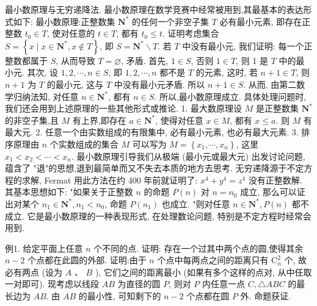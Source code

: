 
最小数原理与无穷递降法.
最小数原理在数学竞赛中经常被用到,其最基本的表达形式如下:
最小数原理:正整数集 $\mathbf{N}^*$ 的任何一个非空子集 $T$ 必有最小元素, 即存在正整数 $t_0 \in T$, 使对任意的 $t \in T$, 都有 $t_0 \leqslant t$.
证明考虑集合 $S=\left\{x \mid x \in \mathbf{N}^*, x \notin T\right\}$, 即 $S=\mathbf{N}^* \backslash T$.
若 $T$ 中没有最小元, 我们证明: 每一个正整数都属于 $S$, 从而导致 $T=\varnothing$, 矛盾.
首先, $1 \in S$, 否则 $1 \in T$, 则 1 是 $T$ 中的最小元.
其次, 设 $1,2, \cdots, n \in S$, 即 $1,2, \cdots, n$ 都不是 $T$ 的元素, 这时, 若 $n+ 1 \in T$, 则 $n+1$ 为 $T$ 的最小元, 这与 $T$ 中没有最小元矛盾.
所以 $n+1 \in S$. 从而, 由第二数学归纳法知, 对任意 $n \in \mathbf{N}^*$, 都有 $n \in S$. 所以,最小数原理成立.
具体处理问题时,我们还会用到上述原理的一些其他形式或推论.
1. 最大数原理设 $M$ 是正整数集 $\mathbf{N}^*$ 的非空子集,且 $M$ 有上界,即存在 $a \in \mathbf{N}^*$, 使得对任意 $x \in M$, 都有 $x \leqslant a$. 则 $M$ 有最大元.
2. 任意一个由实数组成的有限集中, 必有最小元素, 也必有最大元素.
3. 排序原理由 $n$ 个实数组成的集合 $M$ 可以写为 $M=\left\{x_1, \cdots, x_n\right\}$, 这里 $x_1<x_2<\cdots<x_n$.
最小数原理引导我们从极端 (最小元或最大元) 出发讨论问题, 蕴含了 "退"的思想,退到最简单而又不失去本质的地方去思考.
无穷递降源于不定方程的求解, Fermat 用此方法在约 400 年前就证明了: $x^4+y^4=z^4$ 没有正整数解.
其基本思想如下:
"如果关于正整数 $n$ 的命题 $P(n)$ 对 $n=n_0$ 成立, 那么可以证出对某个 $n_1 \in \mathbf{N}^*, n_1<n_0$, 命题 $P\left(n_1\right)$ 也成立.
"则对任意 $n \in \mathbf{N}^*, P(n)$ 都不成立.
它是最小数原理的一种表现形式, 在处理数论问题, 特别是不定方程时经常会用到.



例1. 给定平面上任意 $n$ 个不同的点.
证明: 存在一个过其中两个点的圆,使得其余 $n-2$ 个点都在此圆的外部.
证明:由于 $n$ 个点中每两点之间的距离只有 $\mathrm{C}_n^2$ 个, 故必有两点 (设为 $A$ 、 $B$ ), 它们之间的距离最小 (如果有多个这样的点对, 从中任取一对即可).
现考虑以线段 $A B$ 为直径的圆 $P$, 则对 $P$ 内任意一点 $C, \triangle A B C$ 的最长边为 $A B$. 由 $A B$ 的最小性, 可知剩下的 $n-2$ 个点都在圆 $P$ 外.
命题获证.



